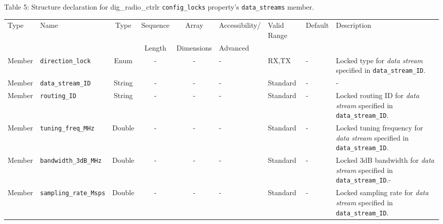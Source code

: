 \documentclass{article}
\def\comp{dig\_radio\_ctrlr}
\begin{document}
\begin{landscape}
	\noindent Table \hypertarget{tab5}{5}: Structure declaration for \comp{} \verb+config_locks+ property's \verb+data_streams+ member. \\
	\begin{scriptsize}
		\noindent\begin{longtable}{|p{1.8cm}|p{3.6cm}|c|c|c|p{2cm}|p{1.7cm}|p{1.0cm}|p{7.38cm}|}
			\hline
			\rowcolor{blue}
			Type         & Name                                & Type & Sequence & Array      & Accessibility/ & Valid Range  & Default & Description                                                                                                                                                                                                                 \\
			\rowcolor{blue}
			             &                                     &      & Length   & Dimensions & Advanced       &              &         &                                                                                                                                                                                                                             \\
			\hline
			Member       & \verb+direction_lock+               & Enum  & -       & -          & -              & RX,TX        & -       & Locked type for \textit{data stream} specified in \verb+data_stream_ID+. \\
			\hline
			Member       & \verb+data_stream_ID+               & String& -       & -          & -              & Standard     & -       & - \\
			\hline
			Member       & \verb+routing_ID+                   & String& -       & -          & -              & Standard     & -       & Locked routing ID for \textit{data stream} specified in \verb+data_stream_ID+. \\
			\hline
			Member       & \verb+tuning_freq_MHz+              & Double & -       & -          & -              & Standard     & -       & Locked tuning frequency for \textit{data stream} specified in \verb+data_stream_ID+. \\
			\hline
			Member       & \verb+bandwidth_3dB_MHz+              & Double & -       & -          & -              & Standard     & -       & Locked 3dB bandwidth for \textit{data stream} specified in \verb+data_stream_ID+.- \\
			\hline
			Member       & \verb+sampling_rate_Msps+             & Double & -       & -          & -              & Standard     & -       & Locked sampling rate for \textit{data stream} specified in \verb+data_stream_ID+. \\

\end{longtable}
\end{scriptsize}
\end{landscape}
\end{document}
